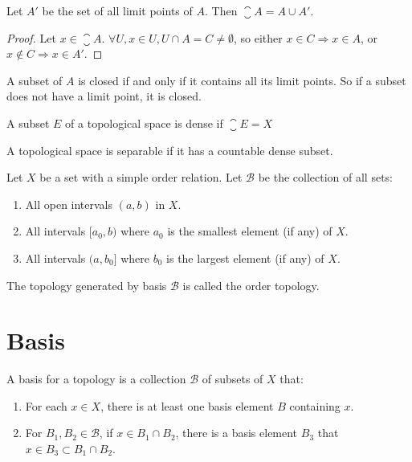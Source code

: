 \begin{theorem}
    Let $A'$ be the set of all limit points of $A$. Then $\closure{A} = A \cup A'$.
\end{theorem}
\begin{proof}
    Let $x \in \closure{A}$. $\forall U, x \in U, U \cap A = C \neq \emptyset$, so either $x \in C \Rightarrow x \in A$, or $x \notin C \Rightarrow x \in A'$.
\end{proof}

\begin{theorem}
A subset of $A$ is closed if and only if it contains all its limit points. So if a subset does not have a limit point, it is closed.
\end{theorem}


\begin{definition}
    A subset $E$ of a topological space is dense if $\closure{E} = X$
\end{definition}

\begin{definition}
    A topological space is separable if it has a countable dense subset.
\end{definition}


\begin{definition}
    Let $X$ be a set with a simple order relation. Let $\mathcal{B}$ be the collection of all sets:
    \begin{enumerate}
        \item All open intervals $(a,b)$ in $X$.
        \item All intervals $[a_0, b)$ where $a_0$ is the smallest element (if any) of $X$.
        \item All intervals $(a, b_0]$ where $b_0$ is the largest element (if any) of $X$.
    \end{enumerate}
    The topology generated by basis $\mathcal{B}$ is called the order topology.
\end{definition}


\section{Basis}

\begin{definition}
    A basis for a topology is a collection $\mathcal{B}$ of subsets of $X$ that:
    \begin{enumerate}
        \item For each $x \in X$, there is at least one basis element $B$ containing $x$.
        \item For $B_1, B_2 \in \mathcal{B}$, if $x \in B_1 \cap B_2$, there is a basis element $B_3$ that $x \in B_3 \subset B_1 \cap B_2$.
    \end{enumerate}
\end{definition}

